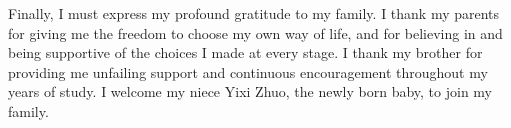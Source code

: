 Finally, I must express my profound gratitude to my family. I thank my parents for giving me the 
freedom to choose my own way of life, and for believing in and being supportive of the choices I 
made at every stage.  I thank my brother for providing me unfailing support and continuous 
encouragement throughout my years of study. I welcome my niece Yixi Zhuo, the newly born baby, to 
join my family.



